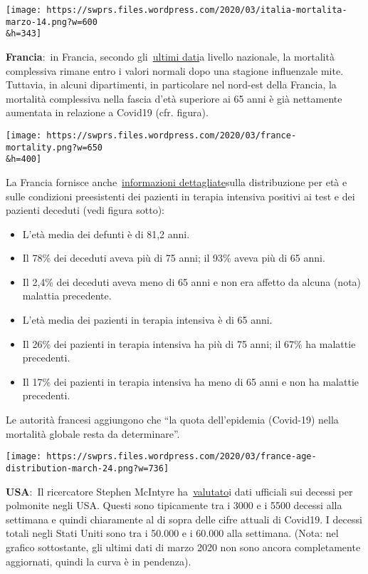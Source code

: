 \texttt{[image: https://swprs.files.wordpress.com/2020/03/italia-mortalita-marzo-14.png?w=600\\\&h=343]}

\textbf{Francia}:~in Francia, secondo
gli~\href{https://www.santepubliquefrance.fr/maladies-et-traumatismes/maladies-et-infections-respiratoires/infection-a-coronavirus/documents/bulletin-national/covid-19-point-epidemiologique-du-24-mars-2020}{ultimi
dati}a livello nazionale, la mortalità complessiva rimane entro i valori
normali dopo una stagione influenzale mite. Tuttavia, in alcuni
dipartimenti, in particolare nel nord-est della Francia, la mortalità
complessiva nella fascia d'età superiore ai 65 anni è già nettamente
aumentata in relazione a Covid19 (cfr. figura).

\texttt{[image: https://swprs.files.wordpress.com/2020/03/france-mortality.png?w=650\\\&h=400]}

La Francia fornisce
anche~\href{https://www.santepubliquefrance.fr/maladies-et-traumatismes/maladies-et-infections-respiratoires/infection-a-coronavirus/documents/bulletin-national/covid-19-point-epidemiologique-du-24-mars-2020}{informazioni
dettagliate}sulla distribuzione per età e sulle condizioni preesistenti
dei pazienti in terapia intensiva positivi ai test e dei pazienti
deceduti (vedi figura sotto):

\begin{itemize}
\tightlist
\item
  L'età media dei defunti è di 81,2 anni.
\item
  Il 78\% dei deceduti aveva più di 75 anni; il 93\% aveva più di 65
  anni.
\item
  Il 2,4\% dei deceduti aveva meno di 65 anni e non era affetto da
  alcuna (nota) malattia precedente.
\item
  L'età media dei pazienti in terapia intensiva è di 65 anni.
\item
  Il 26\% dei pazienti in terapia intensiva ha più di 75 anni; il 67\%
  ha malattie precedenti.
\item
  Il 17\% dei pazienti in terapia intensiva ha meno di 65 anni e non ha
  malattie precedenti.
\end{itemize}

Le autorità francesi aggiungono che ``la quota dell'epidemia (Covid-19)
nella mortalità globale resta da determinare''.

\texttt{[image: https://swprs.files.wordpress.com/2020/03/france-age-distribution-march-24.png?w=736]}

\textbf{USA}:~Il ricercatore Stephen McIntyre
ha~\href{https://twitter.com/ClimateAudit/status/1243019315462516736}{valutato}i
dati ufficiali sui decessi per polmonite negli USA. Questi sono
tipicamente tra i 3000 e i 5500 decessi alla settimana e quindi
chiaramente al di sopra delle cifre attuali di Covid19. I decessi totali
negli Stati Uniti sono tra i 50.000 e i 60.000 alla settimana. (Nota:
nel grafico sottostante, gli ultimi dati di marzo 2020 non sono ancora
completamente aggiornati, quindi la curva è in pendenza).

